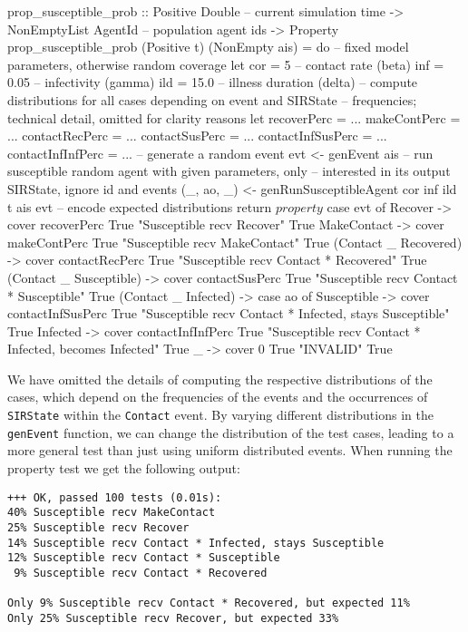 \begin{HaskellCode}
prop_susceptible_prob :: Positive Double       -- current simulation time
                      -> NonEmptyList AgentId  -- population agent ids 
                      -> Property
prop_susceptible_prob (Positive t) (NonEmpty ais) = do
  -- fixed model parameters, otherwise random coverage
  let cor = 5     -- contact rate (beta)
      inf = 0.05  -- infectivity (gamma)
      ild = 15.0  -- illness duration (delta)
  -- compute distributions for all cases depending on event and SIRState
  -- frequencies; technical detail, omitted for clarity reasons
  let recoverPerc       = ...
      makeContPerc      = ...
      contactRecPerc    = ...
      contactSusPerc    = ...
      contactInfSusPerc = ...
      contactInfInfPerc = ...
  -- generate a random event
  evt <- genEvent ais
  -- run susceptible random agent with given parameters, only
  -- interested in its output SIRState, ignore id and events
  (_, ao, _) <- genRunSusceptibleAgent cor inf ild t ais evt
  -- encode expected distributions
  return $ property $ case evt of 
    Recover -> 
      cover recoverPerc True "Susceptible recv Recover" True
    MakeContact -> 
      cover makeContPerc True "Susceptible recv MakeContact" True
    (Contact _ Recovered) -> 
      cover contactRecPerc True "Susceptible recv Contact * Recovered" True
    (Contact _ Susceptible) -> 
      cover contactSusPerc True "Susceptible recv Contact * Susceptible" True
    (Contact _ Infected) -> 
      case ao of
        Susceptible ->
          cover contactInfSusPerc True 
            "Susceptible recv Contact * Infected, stays Susceptible" True
        Infected ->
          cover contactInfInfPerc True 
            "Susceptible recv Contact * Infected, becomes Infected" True
        _ ->
          cover 0 True "INVALID" True
\end{HaskellCode}

We have omitted the details of computing the respective distributions of the cases, which depend on the frequencies of the events and the occurrences of \texttt{SIRState} within the \texttt{Contact} event. By varying different distributions in the \texttt{genEvent} function, we can change the distribution of the test cases, leading to a more general test than just using uniform distributed events. When running the property test we get the following output:

\begin{footnotesize}
\begin{verbatim}
+++ OK, passed 100 tests (0.01s):
40% Susceptible recv MakeContact
25% Susceptible recv Recover
14% Susceptible recv Contact * Infected, stays Susceptible
12% Susceptible recv Contact * Susceptible
 9% Susceptible recv Contact * Recovered
    
Only 9% Susceptible recv Contact * Recovered, but expected 11%
Only 25% Susceptible recv Recover, but expected 33%
\end{verbatim}
\end{footnotesize}


